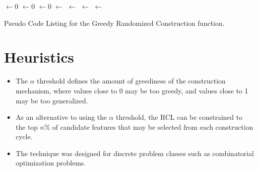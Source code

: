 \documentclass[a4paper, 11pt]{article}
\begin{document}
\begin{algorithm}[ht]
	\SetLine

	\KwIn{\Alpha}
	\KwOut{\Candidate}
	\Candidate $\leftarrow 0$\;
	\While{\Candidate $\neq$ \ProblemSize} {
		\FeatureCosts $\leftarrow 0$\;
		\For{\ProblemFeature $\notin$ \Candidate}{
			\FeatureCosts $\leftarrow$ \CostImpactOfFeature{\Candidate, \ProblemFeature}\;
		}
		\RCL $\leftarrow 0$\;
		\ProblemFeatureMinCost $\leftarrow$ \MinCost{\FeatureCosts}\;
		\ProblemFeatureMaxCost $\leftarrow$ \MaxCost{\FeatureCosts}\;
		\For{\ProblemFeatureCost $\in$ \FeatureCosts} {
			\If{\ProblemFeatureCost $\leq$ $\ProblemFeatureMinCost + \alpha \cdot (\ProblemFeatureMaxCost - \ProblemFeatureMinCost)$ } {
				\RCL $\leftarrow$ \ProblemFeature\;
			}
		}
		\Candidate $\leftarrow$ \SelectRandomFeature{\RCL}\;
	}
	\Return{\Candidate}\;
	\caption{Pseudo Code Listing for the Greedy Randomized Construction function.}
	\label{alg:construction}
\end{algorithm}


\section{Heuristics}
\label{sec:heuristics}
\begin{itemize}
	\item The $\alpha$ threshold defines the amount of greediness of the construction mechanism, where values close to 0 may be too greedy, and values close to 1 may be too generalized.
	\item As an alternative to using the $\alpha$ threshold, the RCL can be constrained to the top $n\%$ of candidate features that may be selected from each construction cycle.
	\item The technique was designed for discrete problem classes such as combinatorial optimization problems.
\end{itemize}
\end{document}
